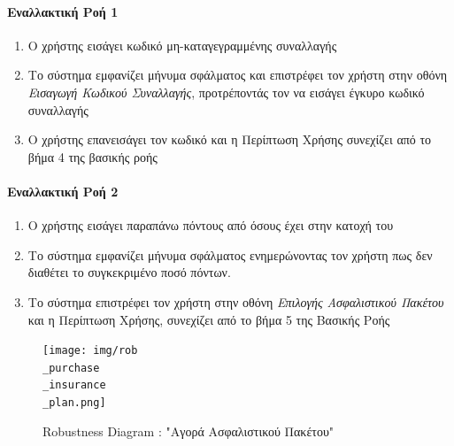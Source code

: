 \documentclass{../ol-softwaremanual}
\begin{document}
	\paragraph{Εναλλακτική Ροή 1 }
	
	\begin{enumerate}
		\item Ο χρήστης εισάγει κωδικό μη-καταγεγραμμένης συναλλαγής
		\item Το σύστημα εμφανίζει μήνυμα σφάλματος και επιστρέφει τον χρήστη στην  οθόνη \textit{Εισαγωγή Κωδικού Συναλλαγής}, προτρέποντάς τον να εισάγει έγκυρο κωδικό συναλλαγής
		\item Ο χρήστης επανεισάγει τον κωδικό και η Περίπτωση Χρήσης συνεχίζει από το βήμα 4 της βασικής ροής
	\end{enumerate}
	
	\paragraph{Εναλλακτική Ροή 2}
	\begin{enumerate}
		\item Ο χρήστης εισάγει παραπάνω πόντους από όσους έχει στην κατοχή του
		\item Το σύστημα εμφανίζει μήνυμα σφάλματος ενημερώνοντας τον χρήστη πως δεν διαθέτει το συγκεκριμένο ποσό πόντων.
		\item Το σύστημα επιστρέφει τον χρήστη στην οθόνη \textit{Επιλογής Ασφαλιστικού Πακέτου} και η Περίπτωση Χρήσης, συνεχίζει από το βήμα 5 της Βασικής Ροής
	\end{enumerate}
	
	\begin{figure}[htbp!]
		\texttt{[image: img/rob\\\_purchase\\\_insurance\\\_plan.png]}
		\caption{\en Robustness Diagram : "\gr Αγορά Ασφαλιστικού Πακέτου\en"\gr}
	\end{figure}
	
	\newpage
	\centering
	
\end{document}
